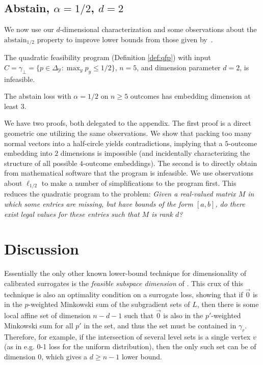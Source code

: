 \documentclass[final]{colt2020} %
\newcommand{\abstain}[1]{\mathrm{abstain}_{#1}}
\newcommand{\simplex}{\Delta_\Y}
\newcommand{\Y}{\mathcal{Y}}
\begin{document}
\subsection{Abstain, $\alpha = 1/2$, $d=2$}
We now use our $d$-dimensional characterization and some observations about the $\abstain{1/2}$ property to improve lower bounds from those given by~\citet{ramaswamy2016convex}.

\begin{proposition}\label{prop:qfp-fails-abstain}
  The quadratic feasibility program (Definition \ref{def:qfp}) with input $C = \gamma_{\bot} = \{p \in \simplex: \max_y p_y \leq 1/2\}$, $n=5$, and dimension parameter $d=2$, is infeasible.
\end{proposition}
\begin{corollary}
  The abstain loss with $\alpha=1/2$ on $n\geq 5$ outcomes has embedding dimension at least $3$.
\end{corollary}

We have two proofs, both delegated to the appendix.
The first proof is a direct geometric one utilizing the same observations.
We show that packing too many normal vectors into a half-circle yields contradictions, implying that a $5$-outcome embedding into $2$ dimensions is impossible (and incidentally characterizing the structure of all possible $4$-outcome embeddings).
The second is to directly obtain from mathematical software that the program is infeasible.
We use observations about $\ell_{1/2}$ to make a number of simplifications to the program first.
This reduces the quadratic program to the problem: 
\emph{Given a real-valued matrix $M$ in which some entries are missing, but have bounds of the form $[a,b]$, do there exist legal values for these entries such that $M$ is rank $d$?}


\section{Discussion} \label{sec:conclusion}

Essentially the only other known lower-bound technique for dimensionality of calibrated surrogates is the \emph{feasible subspace dimension} of \citet{ramaswamy2016convex}.
This crux of this technique is also an optimality condition on a surrogate loss, showing that if $\vec 0$ is in the $p$-weighted Minkowski sum of the subgradient sets of $L$, then there is some local affine set of dimension $n-d-1$ such that $\vec 0$ is also in the $p'$-weighted Minkowski sum for all $p'$ in the set, and thus the set must be contained in $\gamma_r$.
Therefore, for example, if the intersection of several level sets is a single vertex $v$ (as in e.g. 0-1 loss for the uniform distribution), then the only such set can be of dimension $0$, which gives a $d \geq n-1$ lower bound.
\end{document}
